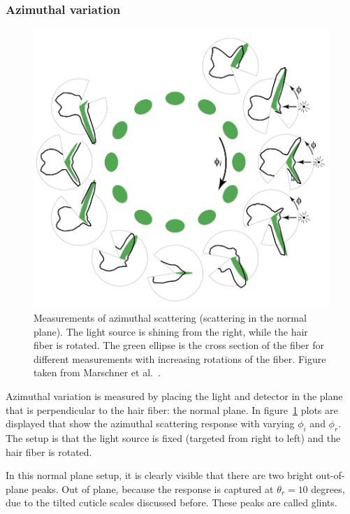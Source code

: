 \documentclass[11pt,a4paper]{report}
\begin{document}
\subsubsection{Azimuthal variation}


\begin{figure}[h]
\begin{center}
\includegraphics[scale=0.4]{images/azimuthal_measurement.jpeg}
\caption{Measurements of azimuthal scattering (scattering in the normal plane). The light source is shining from the right, while the hair fiber is rotated. The green ellipse is the cross section of the fiber for different measurements with increasing rotations of the fiber. Figure taken from Marschner et al.~\cite{marschner}.}
\label{fig_azimuthal_marschner}
\end{center}
\end{figure}


Azimuthal variation is measured by placing the light and detector in the plane that is perpendicular to the hair fiber: the normal plane. In figure~\ref{fig_azimuthal_marschner} plots are displayed that show the azimuthal scattering response with varying $\phi_i$ and $\phi_r$. The setup is that the light source is fixed (targeted from right to left) and the hair fiber is rotated. 

In this normal plane setup, it is clearly visible that there are two bright out-of-plane peaks. Out of plane, because the response is captured at $\theta_r = 10$ degrees, due to the tilted cuticle scales discussed before. These peaks are called glints.
\end{document}
